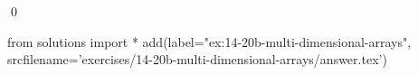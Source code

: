 
\begin{ex} 
  \label{ex:14-20b-multi-dimensional-arrays}
  
  \qed
\end{ex} 
\begin{python0}
from solutions import *
add(label="ex:14-20b-multi-dimensional-arrays",
    srcfilename='exercises/14-20b-multi-dimensional-arrays/answer.tex') 
\end{python0}
